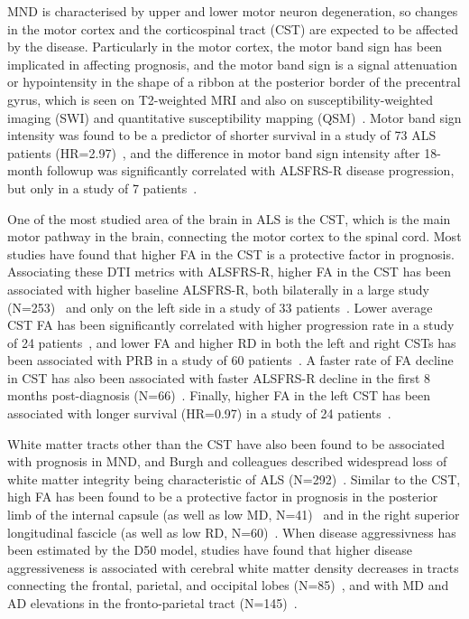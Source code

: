 MND is characterised by upper and lower motor neuron degeneration, so changes in the motor cortex and the corticospinal tract (CST) are expected to be affected by the disease.
Particularly in the motor cortex, the motor band sign has been implicated in affecting prognosis, and the motor band sign is a signal attenuation or hypointensity in the shape of a ribbon at the posterior border of the precentral gyrus, which is seen on T2-weighted MRI and also on susceptibility-weighted imaging (SWI) and quantitative susceptibility mapping (QSM)~\cite{bollHypointensityMotorCortex2019}.
Motor band sign intensity was found to be a predictor of shorter survival in a study of 73 ALS patients (HR=2.97)~\cite{rizzoDiagnosticPrognosticValue2020}, and the difference in motor band sign intensity after 18-month followup was significantly correlated with ALSFRS-R disease progression, but only in a study of 7 patients~\cite{bollHypointensityMotorCortex2019}.

One of the most studied area of the brain in ALS is the CST, which is the main motor pathway in the brain, connecting the motor cortex to the spinal cord.
Most studies have found that higher FA in the CST is a protective factor in prognosis.
Associating these DTI metrics with ALSFRS-R, higher FA in the CST has been associated with higher baseline ALSFRS-R, both bilaterally in a large study (N=253)~\cite{mullerLargescaleMulticentreCerebral2016} and only on the left side in a study of 33 patients~\cite{liBrainstemInvolvementAmyotrophic2021}.
Lower average CST FA has been significantly correlated with higher progression rate in a study of 24 patients~\cite{agostaMRIPredictorsLongterm2010}, and lower FA and higher RD in both the left and right CSTs has been associated with PRB in a study of 60 patients~\cite{menkeWidespreadGreyMatter2014}.
A faster rate of FA decline in CST has also been associated with faster ALSFRS-R decline in the first 8 months post-diagnosis (N=66)~\cite{kalraProspectiveHarmonizedMulticenter2020}.
Finally, higher FA in the left CST has been associated with longer survival (HR=0.97) in a study of 24 patients~\cite{agostaMRIPredictorsLongterm2010}.

White matter tracts other than the CST have also been found to be associated with prognosis in MND, and Burgh and colleagues described widespread loss of white matter integrity being characteristic of ALS (N=292)~\cite{burghMultimodalLongitudinalStudy2020}.
Similar to the CST, high FA has been found to be a protective factor in prognosis in the posterior limb of the internal capsule (as well as low MD, N=41)~\cite{grolezMRICervicalSpinal2018} and in the right superior longitudinal fascicle (as well as low RD, N=60)~\cite{menkeWidespreadGreyMatter2014}.
When disease aggressivness has been estimated by the D50 model, studies have found that higher disease aggressiveness is associated with cerebral white matter density decreases in tracts connecting the frontal, parietal, and occipital lobes (N=85)~\cite{steinbachApplyingD50Disease2020}, and with MD and AD elevations in the fronto-parietal tract (N=145)~\cite{steinbachDiseaseAggressivenessSignatures2021}.

